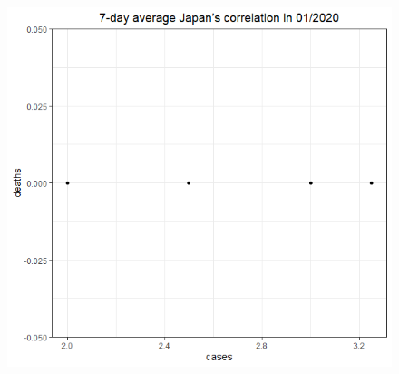 \documentclass[english,10pt,table]{beamer}
\begin{document}
{\begin{figure}[H]
\begin{center}
        \includegraphics[scale = 0.2]{ix/ix.3/JPN_01_2020.png}
        

\end{center}
\end{figure}}
\end{document}
